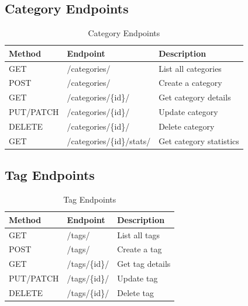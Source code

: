 \documentclass[11pt,a4paper]{article}
\begin{document}
\subsection{Category Endpoints}

\begin{table}[H]
\centering
\small
\begin{tabular}{@{}llp{6cm}@{}}
\toprule
\textbf{Method} & \textbf{Endpoint} & \textbf{Description} \\
\midrule
GET & /categories/ & List all categories \\
POST & /categories/ & Create a category \\
GET & /categories/\{id\}/ & Get category details \\
PUT/PATCH & /categories/\{id\}/ & Update category \\
DELETE & /categories/\{id\}/ & Delete category \\
GET & /categories/\{id\}/stats/ & Get category statistics \\
\bottomrule
\end{tabular}
\caption{Category Endpoints}
\end{table}

\subsection{Tag Endpoints}

\begin{table}[H]
\centering
\small
\begin{tabular}{@{}llp{6cm}@{}}
\toprule
\textbf{Method} & \textbf{Endpoint} & \textbf{Description} \\
\midrule
GET & /tags/ & List all tags \\
POST & /tags/ & Create a tag \\
GET & /tags/\{id\}/ & Get tag details \\
PUT/PATCH & /tags/\{id\}/ & Update tag \\
DELETE & /tags/\{id\}/ & Delete tag \\
\bottomrule
\end{tabular}
\caption{Tag Endpoints}
\end{table}
\end{document}
